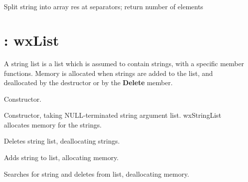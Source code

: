 \label{wxstringJoin}


\label{wxstringSplit}

\\
\\

Split string into array res at separators; return number of elements



\section{: wxList}\label{wxstringlist}

A string list is a list which is assumed to contain strings, with a
specific member functions. Memory is allocated when strings are added to
the list, and deallocated by the destructor or by the {\bf Delete}\rtfsp
member.



Constructor.


Constructor, taking NULL-terminated string argument list. wxStringList
allocates memory for the strings.



Deletes string list, deallocating strings.



Adds string to list, allocating memory.



Searches for string and deletes from list, deallocating memory.

